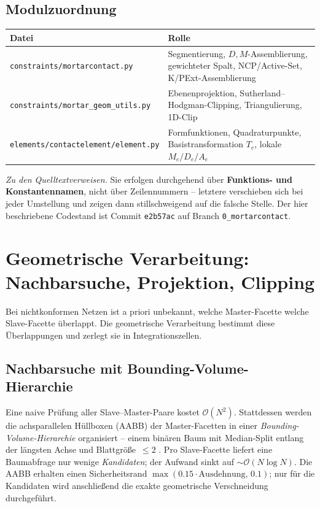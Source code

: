 \documentclass[a4paper,11pt]{article}
\def\bm#1{#1}%
\newcommand{\code}[1]{\texttt{\small #1}}
\newcommand{\file}[1]{\texttt{\small #1}}
\let\stdsection\section
\renewcommand{\section}{\clearpage\stdsection}
\begin{document}
\subsection{Modulzuordnung}
\begin{center}
\small
\begin{tabularx}{\linewidth}{lX}
\toprule
Datei & Rolle \\
\midrule
\file{constraints/mortarcontact.py} & Segmentierung, $\bm D,\bm M$-Assemblierung, gewichteter Spalt, NCP/Active-Set, K/PExt-Assemblierung \\
\file{constraints/mortar\_geom\_utils.py} & Ebenenprojektion, Sutherland--Hodgman-Clipping, Triangulierung, 1D-Clip \\
\file{elements/contactelement/element.py} & Formfunktionen, Quadraturpunkte, Basistransformation $\bm T_e$, lokale $\bm M_e/\bm D_e/\bm A_e$ \\
\bottomrule
\end{tabularx}
\end{center}

\noindent\emph{Zu den Quelltextverweisen.} Sie erfolgen durchgehend über \textbf{Funktions- und
Konstantennamen}, nicht über Zeilennummern -- letztere verschieben sich bei jeder Umstellung und
zeigen dann stillschweigend auf die falsche Stelle. Der hier beschriebene Codestand ist Commit
\code{e2b57ac} auf Branch \code{0\_mortarcontact}.

\section{Geometrische Verarbeitung: Nachbarsuche, Projektion, Clipping}
\label{sec:geometrie}

Bei nichtkonformen Netzen ist a priori unbekannt, welche Master-Facette welche Slave-Facette
überlappt. Die geometrische Verarbeitung bestimmt diese Überlappungen und zerlegt sie in
Integrationszellen.

\subsection{Nachbarsuche mit Bounding-Volume-Hierarchie}
Eine naive Prüfung aller Slave--Master-Paare kostet $\mathcal O(N^2)$. Stattdessen werden die
achsparallelen Hüllboxen (AABB) der Master-Facetten in einer \emph{Bounding-Volume-Hierarchie}
organisiert -- einem binären Baum mit Median-Split entlang der längsten Achse und Blattgröße~$\le2$
\citep{ericson2004}. Pro Slave-Facette liefert eine Baumabfrage nur wenige
\emph{Kandidaten}; der Aufwand sinkt auf $\sim\mathcal O(N\log N)$. Die AABB erhalten einen
Sicherheitsrand $\max(0.15\cdot\text{Ausdehnung},\,0.1)$; nur für die Kandidaten wird anschließend
die exakte geometrische Verschneidung durchgeführt.
\end{document}
